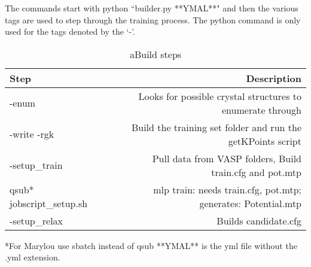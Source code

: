 \documentclass{article}
\begin{document}
The commands start with python ``builder.py **YMAL**" and then the
various tags are used to step through the training process. The python
command is only used for the tags denoted by the `-'.


\begin{table}
        \begin{center}
                \caption{aBuild steps}
                \label{bashcommands}
                \begin{tabular}{l|r}
                  \textbf{Step} & \textbf{Description}\\
                  \hline
                  -enum & Looks for possible crystal structures to
                          enumerate through\\
                  -write -rgk & Build the training set folder and run
                                the getKPoints script\\
                  -setup\_train & Pull data from VASP folders, Build
                                 train.cfg and pot.mtp\\
                  qsub* jobscript\_setup.sh & mlp train: needs
                                             train.cfg, pot.mtp;
                                              generates:
                                              Potential.mtp\\
                  -setup\_relax & Builds candidate.cfg

                                                      
                 \end{tabular}
        \end{center}
\end{table}

*For Marylou use sbatch instead of qsub
**YMAL** is the yml file without the .yml extension.
\end{document}
